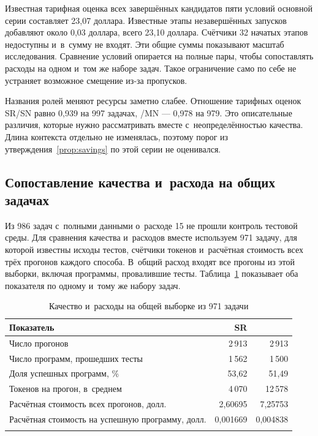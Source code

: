 Известная тарифная оценка всех завершённых кандидатов пяти условий основной серии составляет 23,07 доллара. Известные этапы незавершённых запусков добавляют около 0,03 доллара, всего 23,10 доллара. Счётчики 32 начатых этапов недоступны и~в~сумму не входят. Эти общие суммы показывают масштаб исследования. Сравнение условий опирается на полные пары, чтобы сопоставлять расходы на одном и~том же наборе задач. Такое ограничение само по себе не устраняет возможное смещение из-за пропусков.

Названия ролей меняют ресурсы заметно слабее. Отношение тарифных оценок SR/SN равно 0,939 на 997 задачах, \MultiCallRole{}/MN --- 0,978 на 979. Это описательные различия, которые нужно рассматривать вместе с~неопределённостью качества. Длина контекста отдельно не изменялась, поэтому порог из утверждения~\ref{prop:savings} по этой серии не оценивался.

\subsection{Сопоставление качества и~расхода на общих задачах}
Из 986 задач с~полными данными о~расходе 15 не прошли контроль тестовой среды. Для сравнения качества и~расходов вместе используем 971 задачу, для которой известны исходы тестов, счётчики токенов и~расчётная стоимость всех трёх прогонов каждого способа. В~общий расход входят все прогоны из этой выборки, включая программы, провалившие тесты. Таблица~\ref{tab:scale-quality-cost} показывает оба показателя по одному и~тому же набору задач.

\begin{table}[htbp]
\caption{Качество и~расходы на общей выборке из 971 задачи}
\label{tab:scale-quality-cost}
\centering\small\renewcommand{\arraystretch}{1.18}
\begin{tabular}{@{}lrr@{}}
\toprule
Показатель & SR & \MultiCallRole{} \\
\midrule
Число прогонов & 2\,913 & 2\,913 \\
Число программ, прошедших тесты & 1\,562 & 1\,500 \\
Доля успешных программ, \% & 53,62 & 51,49 \\
Токенов на прогон, в~среднем & 4\,070 & 12\,578 \\
Расчётная стоимость всех прогонов, долл. & 2,60695 & 7,25753 \\
Расчётная стоимость на успешную программу, долл. & 0,001669 & 0,004838 \\
\botrule
\end{tabular}
\end{table}
\FloatBarrier

